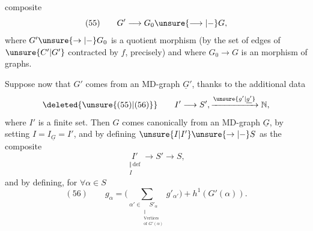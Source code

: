 composite
\[
(55)\qquad G'\longrightarrow G_0\unsure{\longrightarrow|{-}}G,
\]
where $G'\unsure{\to|{-}}G_0$ is a quotient morphism (by the set of edges of $\unsure{C'|G'}$ contracted by $f$, precisely) and where $G_0\longrightarrow G$ is an  morphism of graphs.

Suppose now that $G'$   comes  from an MD-graph $\underline G'$, thanks to the additional data
\[
\deleted{\unsure{(55)|(56)}}\qquad I'\longrightarrow S',\xrightarrow{\unsure{g'|\underline{g'}}}\mathbb N,
\]
where $I'$ is a finite set. Then $G$ comes canonically from an MD-graph $\underline G$, by setting $I=I_{\underline G}=I'$, and by defining $\unsure{I|I'}\unsure{\to|{-}}S$ as the composite
\[
\underset{\substack{\Vert\,\mathrm{def}\\I}}{I'}\longrightarrow S'\longrightarrow S,
\]
and by defining, for $\forall\alpha\in S$
\[
(56)\qquad g_\alpha=\Big(\sum_{\alpha'\in\underset{\substack{\Vert\\\text{Vertices}\\\text{of }G'(\alpha)}}{S'_\alpha}}g'_{\alpha'}\Big)+h^1(G'(\alpha)).
\]
